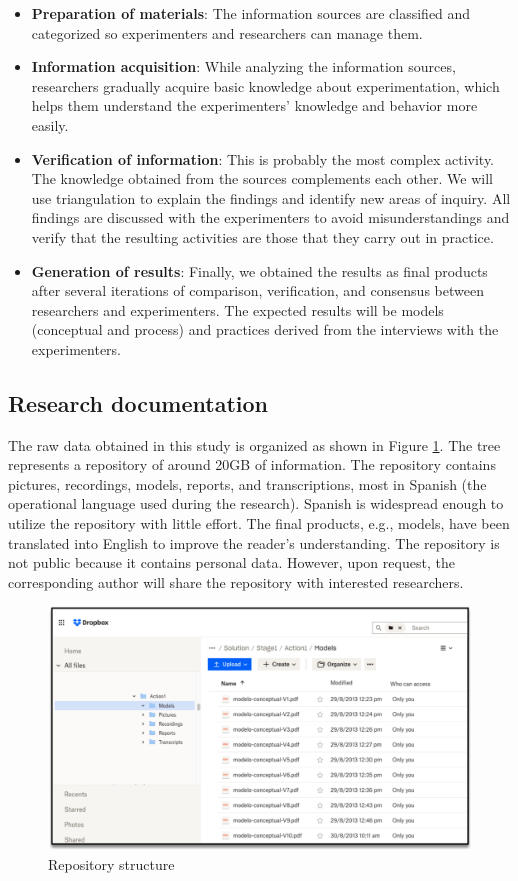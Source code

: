 \begin{itemize}
\item \textbf{Preparation of materials}: The information sources are classified and categorized so experimenters and researchers can manage them.
\item \textbf{Information acquisition}: While analyzing the information sources, researchers gradually acquire basic knowledge about experimentation, which helps them understand the experimenters' knowledge and behavior more easily.
\item \textbf{Verification of information}: This is probably the most complex activity. The knowledge obtained from the sources complements each other. We will use triangulation to explain the findings and identify new areas of inquiry. All findings are discussed with the experimenters to avoid misunderstandings and verify that the resulting activities are those that they carry out in practice.
\item \textbf{Generation of results}: Finally, we obtained the results as final products after several iterations of comparison, verification, and consensus between researchers and experimenters. The expected results will be models (conceptual and process) and practices derived from the interviews with the experimenters.
\end{itemize}

\subsection{Research documentation}\label{sub-sec-research-documentaition}
The raw data obtained in this study is organized as shown in Figure \ref{fig-info-study}. The tree represents a repository of around 20GB of information. The repository contains pictures, recordings, models, reports, and transcriptions, most in Spanish (the operational language used during the research). Spanish is widespread enough to utilize the repository with little effort. The final products, e.g., models, have been translated into English to improve the reader's understanding. The repository is not public because it contains personal data. However, upon request, the corresponding author will share the repository with interested researchers.

\begin{figure}[htbp!]
	\centering
	\includegraphics[width=\columnwidth]{images/Intermediate-Products}
	\caption{Repository structure}
	\label{fig-info-study}
\end{figure}
